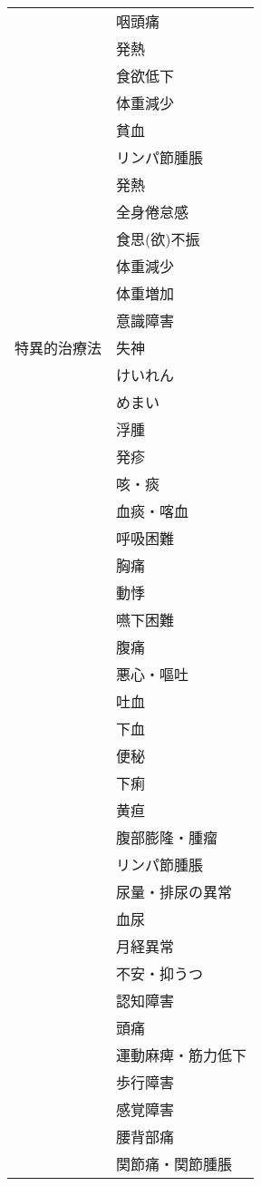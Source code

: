 \begin{xltabular}{\linewidth}{XX}
 & 咽頭痛 \\
 & 発熱 \\
 & 食欲低下 \\
 & 体重減少 \\
 & 貧血 \\
 & リンパ節腫脹 \\
 & 発熱 \\
 & 全身倦怠感 \\
 & 食思(欲)不振 \\
 & 体重減少 \\
 & 体重増加 \\
 & 意識障害 \\
特異的治療法 & 失神 \\
 & けいれん \\
 & めまい \\
 & 浮腫 \\
 & 発疹 \\
 & 咳・痰 \\
 & 血痰・喀血 \\
 & 呼吸困難 \\
 & 胸痛 \\
 & 動悸 \\
 & 嚥下困難 \\
 & 腹痛 \\
 & 悪心・嘔吐 \\
 & 吐血 \\
 & 下血 \\
 & 便秘 \\
 & 下痢 \\
 & 黄疸 \\
 & 腹部膨隆・腫瘤 \\
 & リンパ節腫脹 \\
 & 尿量・排尿の異常 \\
 & 血尿 \\
 & 月経異常 \\
 & 不安・抑うつ \\
 & 認知障害 \\
 & 頭痛 \\
 & 運動麻痺・筋力低下 \\
 & 歩行障害 \\
 & 感覚障害 \\
 & 腰背部痛 \\
 & 関節痛・関節腫脹 \\
\bottomrule
\end{xltabular}



